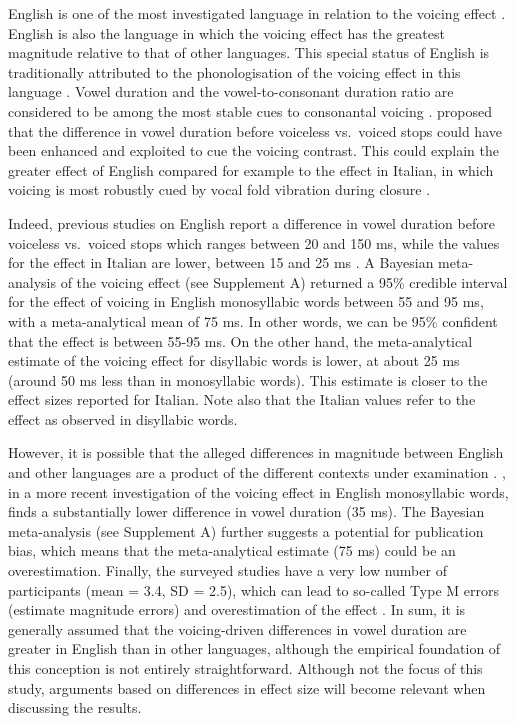 \documentclass[
  12pt,
  a4paper,
  authoryear, 5p]{elsarticle}
\begin{document}
English is one of the most investigated language in relation to the
voicing effect
\citep{meyer1904, heffner1937, house1953, belasco1953, peterson1960, halle1967, chen1970, klatt1973, lisker1974, laeufer1992, fowler1992, hussein1994, lampp2004, warren2005, durvasula2012, ko2018}.
English is also the language in which the voicing effect has the
greatest magnitude relative to that of other languages. This special
status of English is traditionally attributed to the phonologisation of
the voicing effect in this language \citep{sharf1964, de-jong2004}.
Vowel duration and the vowel-to-consonant duration ratio are considered
to be among the most stable cues to consonantal voicing
\citep{peterson1960, raphael1972, port1982}. \citet{kluender1988}
proposed that the difference in vowel duration before voiceless
vs.~voiced stops could have been enhanced and exploited to cue the
voicing contrast. This could explain the greater effect of English
compared for example to the effect in Italian, in which voicing is most
robustly cued by vocal fold vibration during closure \citep{pape2014}.

Indeed, previous studies on English report a difference in vowel
duration before voiceless vs.~voiced stops which ranges between 20 and
150 ms, while the values for the effect in Italian are lower, between 15
and 25 ms
\citep{caldognetto1979, farnetani1986, esposito2002, coretta2018j}. A
Bayesian meta-analysis of the voicing effect (see Supplement A) returned
a 95\% credible interval for the effect of voicing in English
monosyllabic words between 55 and 95 ms, with a meta-analytical mean of
75 ms. In other words, we can be 95\% confident that the effect is
between 55-95 ms. On the other hand, the meta-analytical estimate of the
voicing effect for disyllabic words is lower, at about 25 ms (around 50
ms less than in monosyllabic words). This estimate is closer to the
effect sizes reported for Italian. Note also that the Italian values
refer to the effect as observed in disyllabic words.

However, it is possible that the alleged differences in magnitude
between English and other languages are a product of the different
contexts under examination \citep{laeufer1992}. \citet{ko2018}, in a
more recent investigation of the voicing effect in English monosyllabic
words, finds a substantially lower difference in vowel duration (35 ms).
The Bayesian meta-analysis (see Supplement A) further suggests a
potential for publication bias, which means that the meta-analytical
estimate (75 ms) could be an overestimation. Finally, the surveyed
studies have a very low number of participants (mean = 3.4, SD = 2.5),
which can lead to so-called Type M errors (estimate magnitude errors)
and overestimation of the effect \citep{kirby2018, roettger2019}. In
sum, it is generally assumed that the voicing-driven differences in
vowel duration are greater in English than in other languages, although
the empirical foundation of this conception is not entirely
straightforward. Although not the focus of this study, arguments based
on differences in effect size will become relevant when discussing the
results.
\end{document}
